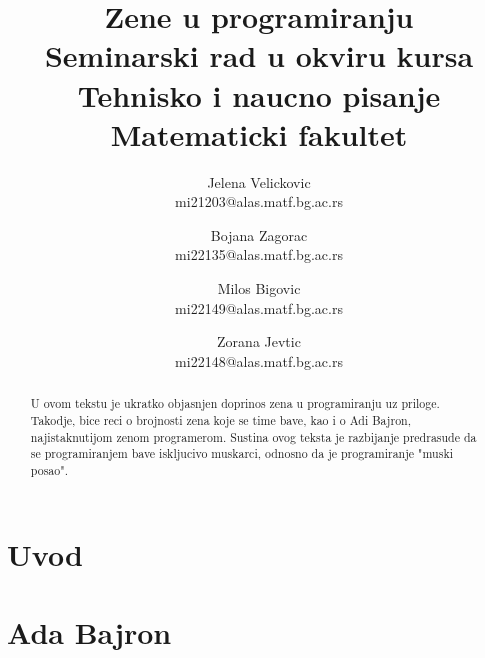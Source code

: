 \documentclass[a4paper,12pt]{article}
\begin{document}
\title{\textbf{Zene u programiranju\\} \small{Seminarski rad u okviru kursa\\Tehnisko i naucno pisanje\\ Matematicki fakultet}}

\author{Jelena Velickovic\\ mi21203@alas.matf.bg.ac.rs \and Bojana Zagorac\\ mi22135@alas.matf.bg.ac.rs \and Milos Bigovic\\ mi22149@alas.matf.bg.ac.rs \and Zorana Jevtic\\ mi22148@alas.matf.bg.ac.rs}

\date{\textit{}}

\maketitle

\begin{abstract}
    U ovom tekstu je ukratko objasnjen doprinos zena u programiranju uz priloge. Takodje, bice reci o
    brojnosti zena koje se time bave, kao i o Adi Bajron, najistaknutijom zenom programerom. Sustina 
    ovog teksta je razbijanje predrasude da se programiranjem bave iskljucivo muskarci, odnosno da je 
    programiranje "muski posao". 
\end{abstract}


\color{blue}\tableofcontents

\newpage
\color{black}\section{Uvod}

\newpage
\section{Ada Bajron}
\end{document}
